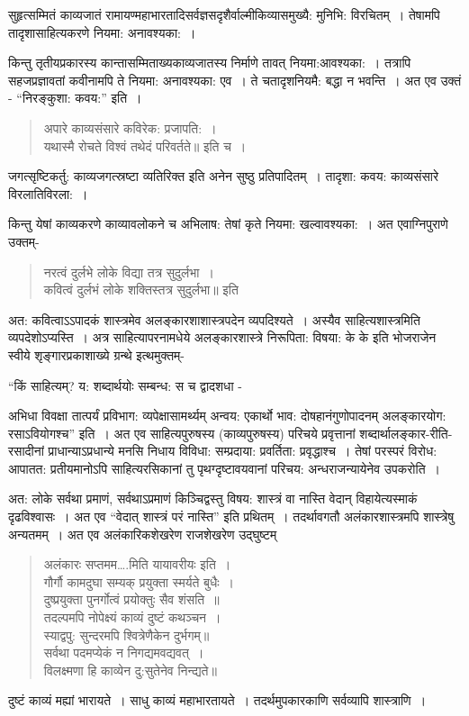 {सुहृत्सम्मितं काव्यजातं रामायण्महाभारतादिसर्वज्ञसदृशैर्वाल्मीकिव्यासमुख्यै: मुनिभि: विरचितम्~। तेषामपि तादृशासाहित्यकरणे नियमा: अनावश्यका:~। 

किन्तु तृतीयप्रकारस्य कान्तासम्मिताख्यकाव्यजातस्य निर्माणे तावत् नियमा:\break आवश्यका:~। तत्रापि सहजप्रज्ञावतां कवीनामपि ते नियमा: अनावश्यका: एव~। ते च\break तादृशनियमै: बद्धा न भवन्ति~।  अत एव उक्तं - “निरङ्कुशा: कवय:” इति~। 
\begin{verse}
अपारे काव्यसंसारे कविरेक: प्रजापति:~। \\
यथास्मै रोचते विश्वं तथेदं परिवर्तते॥ इति च~। 
\end{verse}
जगत्सृष्टिकर्तु: काव्यजगत्स्रष्टा व्यतिरिक्त इति अनेन सुष्ठु प्रतिपादितम्~। तादृशा: कवय: काव्यसंसारे विरलातिविरला:~। 

किन्तु येषां काव्यकरणे काव्यावलोकने च अभिलाष: तेषां कृते नियमा: खल्वावश्यका:~। अत एवाग्निपुराणे उक्तम्-
\begin{verse}
नरत्वं दुर्लभे लोके विद्या तत्र सुदुर्लभा~। \\
कवित्वं दुर्लभं लोके शक्तिस्तत्र सुदुर्लभा॥ इति
\end{verse}
अत: कवित्वाऽऽपादकं शास्त्रमेव अलङ्कारशाशास्त्रपदेन व्यपदिश्यते~। अस्यैव साहित्य\-शास्त्रमिति व्यपदेशोऽप्यस्ति~। अत्र साहित्यापरनामधेये अलङ्कारशास्त्रे निरूपिता: विषया: के के इति भोजराजेन स्वीये शृङ्गारप्रकाशाख्ये ग्रन्थे इत्थमुक्तम्-

“किं साहित्यम्? य: शब्दार्थयोः सम्बन्ध: स च द्वादशधा -

अभिधा विवक्षा तात्पर्यं प्रविभाग: व्यपेक्षासामर्थ्यम् अन्वय: एकार्थो भाव: दोषहानं\break गुणोपादनम् अलङ्कारयोग: रसाऽवियोगश्च” इति~। अत एव साहित्यपुरुषस्य (काव्य\-पुरुषस्य) परिचये प्रवृत्तानां शब्दार्थालङ्कार-रीति-रसादीनां प्राधान्याऽप्रधान्ये मनसि निधाय विविधा: सम्प्रदाया: प्रवर्तिता: प्रवृद्धाश्च~। तेषां परस्परं विरोध: आपातत: प्रतीयमानोऽपि साहित्यरसिकानां तु पृथग्दृष्टावयवानां  परिचय: अन्धराजन्यायेनेव उपकरोति~। 

अत: लोके सर्वथा प्रमाणं, सर्वथाऽप्रमाणं किञ्चिद्वस्तु विषय: शास्त्रं वा नास्ति वेदान् विहायेत्यस्माकं दृढविश्वासः~। अत एव “वेदात् शास्त्रं परं नास्ति” इति प्रथितम्~। तदर्थावगतौ अलंकारशास्त्रमपि शास्त्रेषु अन्यतमम्~। अत एव अलंकारिकशेखरेण राजशेखरेण उद्घुष्टम् 
\begin{verse}
अलंकारः सप्तमम….मिति यायावरीयः इति~। \\
गौर्गौ कामदुघा सम्यक् प्रयुक्ता स्मर्यते बुधैः~। \\
दुष्प्रयुक्ता पुनर्गोत्वं प्रयोक्तुः सैव शंसति~॥\\
तदल्पमपि नोपेक्ष्यं काव्यं दुष्टं कथञ्चन~। \\
स्याद्वपु: सुन्दरमपि श्वित्रेणैकेन दुर्भगम्॥\\
सर्वथा पदमप्येकं न निगद्यमवद्यवत्~। \\
विलक्ष्मणा हि काव्येन दु:सुतेनेव निन्द्यते॥
\end{verse}
दुष्टं काव्यं मह्यां भारायते~। साधु काव्यं महाभारतायते~। तदर्थमुपकारकाणि सर्वव्यापि शास्त्राणि~। 

}
